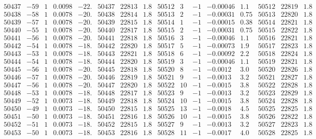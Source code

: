 \documentclass[11pt,reqno,a4letter]{article}
\numberwithin{figure}{section}
\numberwithin{table}{section}
\theoremstyle{plain}
\numberwithin{theorem}{section}
\theoremstyle{definition}
\begin{document}
\begin{table}[ht]
\begin{equation*}
{\begin{array}{ccccc|ccc||ccccc|ccc}
50437 & -59 & 1 & 0.0098 & -22. & 50437 & 22813 & 1.8 & 50512 & 3 & -1 & -0.00046 & 1.1 & 50512 & 22819 & 1.8  \\
50438 & -58 & 1 & 0.0078 & -20. & 50438 & 22814 & 1.8 & 50513 & 2 & -1 & -0.00031 & 0.75 & 50513 & 22820 & 1.8  \\
50439 & -57 & 1 & 0.0078 & -20. & 50439 & 22815 & 1.8 & 50514 & 1 & -1 & -0.00015 & 0.38 & 50514 & 22821 & 1.8  \\
50440 & -55 & 1 & 0.0078 & -20. & 50440 & 22817 & 1.8 & 50515 & 2 & -1 & -0.00031 & 0.75 & 50515 & 22822 & 1.8  \\
50441 & -56 & 1 & 0.0078 & -20. & 50441 & 22818 & 1.8 & 50516 & 3 & -1 & -0.00046 & 1.1 & 50516 & 22821 & 1.8  \\
50442 & -54 & 1 & 0.0078 & -18. & 50442 & 22820 & 1.8 & 50517 & 5 & -1 & -0.00073 & 1.9 & 50517 & 22823 & 1.8  \\
50443 & -53 & 1 & 0.0078 & -18. & 50443 & 22821 & 1.8 & 50518 & 6 & -1 & -0.00092 & 2.2 & 50518 & 22824 & 1.8  \\
50444 & -54 & 1 & 0.0078 & -18. & 50444 & 22820 & 1.8 & 50519 & 3 & -1 & -0.00046 & 1.1 & 50519 & 22821 & 1.8  \\
50445 & -56 & 1 & 0.0078 & -20. & 50445 & 22818 & 1.8 & 50520 & 8 & -1 & -0.0012 & 3.0 & 50520 & 22826 & 1.8  \\
50446 & -57 & 1 & 0.0078 & -20. & 50446 & 22819 & 1.8 & 50521 & 9 & -1 & -0.0013 & 3.2 & 50521 & 22827 & 1.8  \\
50447 & -56 & 1 & 0.0078 & -20. & 50447 & 22820 & 1.8 & 50522 & 10 & -1 & -0.0015 & 3.8 & 50522 & 22828 & 1.8  \\
50448 & -53 & 1 & 0.0078 & -18. & 50448 & 22817 & 1.8 & 50523 & 9 & -1 & -0.0013 & 3.2 & 50523 & 22829 & 1.8  \\
50449 & -52 & 1 & 0.0073 & -18. & 50449 & 22818 & 1.8 & 50524 & 10 & -1 & -0.0015 & 3.8 & 50524 & 22828 & 1.8  \\
50450 & -49 & 1 & 0.0073 & -18. & 50450 & 22815 & 1.8 & 50525 & 13 & -1 & -0.0018 & 4.5 & 50525 & 22825 & 1.8  \\
50451 & -50 & 1 & 0.0073 & -18. & 50451 & 22816 & 1.8 & 50526 & 10 & -1 & -0.0015 & 3.8 & 50526 & 22822 & 1.8  \\
50452 & -51 & 1 & 0.0073 & -18. & 50452 & 22815 & 1.8 & 50527 & 9 & -1 & -0.0013 & 3.2 & 50527 & 22823 & 1.8  \\
50453 & -50 & 1 & 0.0073 & -18. & 50453 & 22816 & 1.8 & 50528 & 11 & -1 & -0.0017 & 4.0 & 50528 & 22825 & 1.8  \\

\end{array}}
\end{equation*}
\end{table}
\end{document}
